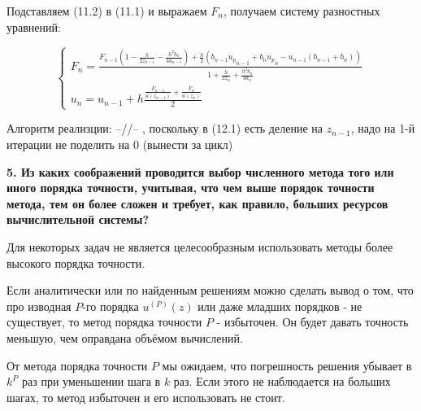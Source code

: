 \documentclass[a4paper,12pt]{article}
\begin{document}
    Подставляем (11.2) в (11.1) и выражаем $F_n$, получаем систему разностных уравнений:

    \Large
    \begin{equation}
        \begin{cases}
            F_n = \frac{F_{n-1}(1 - \frac{h}{2z_{n-1}} - \frac{h^2b_n}{4a_{n-1}}) + 
            \frac{h}{2}(b_{n-1}{u_p}_{n-1} + b_n{u_p}_n - u_{n-1}(b_{n-1} + b_n))}
            {1 + \frac{h}{2z_n} + \frac{h^2b_n}{4a_n}}\\
            u_n = u_{n-1} + h \frac{\frac{F_{n-1}}{a(z_{n-1})} + \frac{F_n}{a(z_n)}}{2}
        \end{cases}
    \end{equation}
    \normalsize

    Алгоритм реализции: --//-- , поскольку в (12.1) есть деление на $z_{n-1}$, надо на 1-й
    итерации не поделить на 0 (вынести за цикл)

    \vspace{1cm}
    \textbf{5. Из каких соображений проводится выбор численного метода того или иного порядка 
    точности, учитывая, что чем выше порядок точности метода, тем он более сложен и требует, 
    как правило, больших ресурсов вычислительной системы?}

    \color{red}

    Для некоторых задач не является целесообразным использовать методы более высокого порядка
    точности. 

    Если аналитически или по найденным решениям можно сделать вывод о том, 
    что про изводная $P$-го порядка
    $u^{(P)}(z)$ или даже младших порядков - не существует, то метод порядка точности $P$ - 
    избыточен. Он будет давать точность 
    меньшую, чем оправдана объёмом вычислений.
    
    От метода порядка точности $P$ мы ожидаем, что погрешность решения убывает 
    в $k^P$ раз при уменьшении шага в $k$ раз. Если этого не наблюдается на больших шагах, то
    метод избыточен и его использовать не стоит. 


\end{document}
